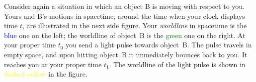 \documentclass[a4paper,12pt,%
onecolumn,oneside,%
british%
]{memoir}
\renewcommand*{\|}[1][]{\nonscript\:#1\vert\nonscript\:\mathopen{}}
\newcommand*{\yti}{t_{0}}
\newcommand*{\ytf}{t_{1}}
\begin{document}
Consider again a situation in which an object B is moving with respect to you. Yours and B's motions in spacetime, around the time when your clock displays time $t$, are illustrated in the next side figure.
Your \emph{worldline} in spacetime is the \textcolor{blue}{blue} one on the left; the worldline of object~B is the \textcolor{green}{green} one on the right. At your proper time $\yti$ you send a light pulse towards object~B. The pulse travels in empty space, and upon hitting object~B it immediately bounces back to you. It reaches you at your proper time $\ytf$. The worldline of the light pulse is shown in \textcolor{yellow}{dashed yellow} in the figure.
%
%
\end{document}
